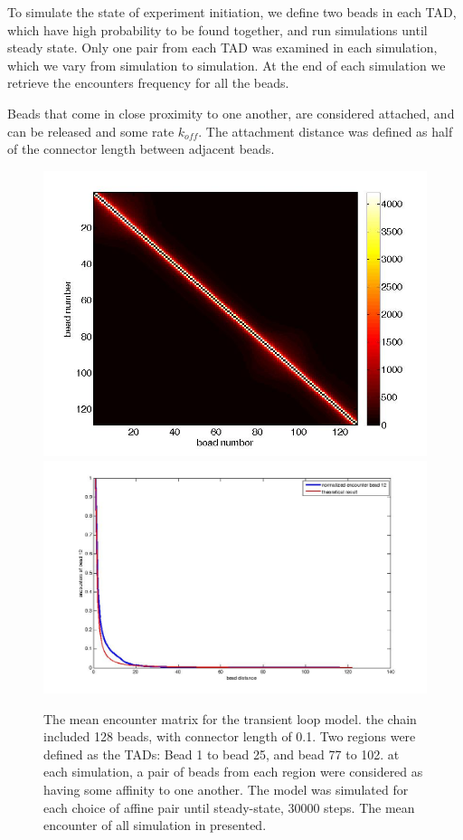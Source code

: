 \documentclass[12pt]{book}
\begin{document}
To simulate the state of experiment initiation, we define two beads in each TAD, which have high probability to be found together, and run simulations until steady state. Only one pair from each TAD was examined in each simulation, which we vary from simulation to simulation. At the end of each simulation we retrieve the encounters frequency for all the beads. 

Beads that come in close proximity to one another, are considered attached, and can be released and some rate $k_{off}$. The attachment distance was defined as half of the connector length between adjacent beads. 

\begin{figure}[H]
\includegraphics[scale=0.2]{encounterFrequency128beadsWithTadTransientModel}
\includegraphics[scale=0.2]{encounterCrossectionBead12TransientLoopModelwithTheoreticalCurve}
\caption{\scriptsize{The mean encounter matrix for the transient loop model. the chain included 128 beads, with connector length of 0.1. Two regions were defined as the TADs: Bead 1 to bead 25, and bead 77 to 102. at each simulation, a pair of beads from each region were considered as having some affinity to one another. The model was simulated for each choice of affine pair until steady-state, 30000 steps. The mean encounter of all simulation in presented.}} 
\end{figure}
\end{document}
